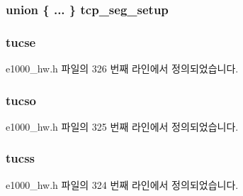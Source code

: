 \subsubsection[{\texorpdfstring{tcp\+\_\+seg\+\_\+setup}{tcp_seg_setup}}]{\setlength{\rightskip}{0pt plus 5cm}union \{ ... \}   tcp\+\_\+seg\+\_\+setup}\hypertarget{structe1000__context__desc_a5f8df7de4aa289e900e215559a506f6f}{}\label{structe1000__context__desc_a5f8df7de4aa289e900e215559a506f6f}
\subsubsection[{\texorpdfstring{tucse}{tucse}}]{ tucse}\hypertarget{structe1000__context__desc_abc5b007bf4cc0496eeaafb3bdadd0d64}{}\label{structe1000__context__desc_abc5b007bf4cc0496eeaafb3bdadd0d64}


e1000\+\_\+hw.\+h 파일의 326 번째 라인에서 정의되었습니다.

\subsubsection[{\texorpdfstring{tucso}{tucso}}]{ tucso}\hypertarget{structe1000__context__desc_ac72c1231d4c427eb788cdb62125151d3}{}\label{structe1000__context__desc_ac72c1231d4c427eb788cdb62125151d3}


e1000\+\_\+hw.\+h 파일의 325 번째 라인에서 정의되었습니다.

\subsubsection[{\texorpdfstring{tucss}{tucss}}]{ tucss}\hypertarget{structe1000__context__desc_a39a30d6a63ff148f8c44b54a51c889c4}{}\label{structe1000__context__desc_a39a30d6a63ff148f8c44b54a51c889c4}


e1000\+\_\+hw.\+h 파일의 324 번째 라인에서 정의되었습니다.

